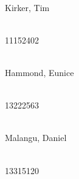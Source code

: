 \begin{titlepage}
\begin{center}
	
		\begin{minipage}{0.4\textwidth}
			\begin{flushleft} \large
				\emph{} \\	
				Kirker, Tim	
			\end{flushleft}
		\end{minipage}
		\begin{minipage}{0.4\textwidth}
			\begin{flushright} \large
				\emph{} \\
				11152402	
			\end{flushright}
		\end{minipage}
		
		
		\begin{minipage}{0.4\textwidth}
			\begin{flushleft} \large
				\emph{} \\
				Hammond, Eunice
			\end{flushleft}
		\end{minipage}
		\begin{minipage}{0.4\textwidth}
			\begin{flushright} \large
				\emph{} \\
				13222563
			\end{flushright}
		\end{minipage}
		
		       
		\begin{minipage}{0.4\textwidth}
			\begin{flushleft} \large
				\emph{} \\
				Malangu, Daniel
			\end{flushleft}
		\end{minipage}
		\begin{minipage}{0.4\textwidth}
			\begin{flushright} \large
				\emph{} \\
				13315120
			\end{flushright}
		\end{minipage}
				
	\end{center}
\end{titlepage}